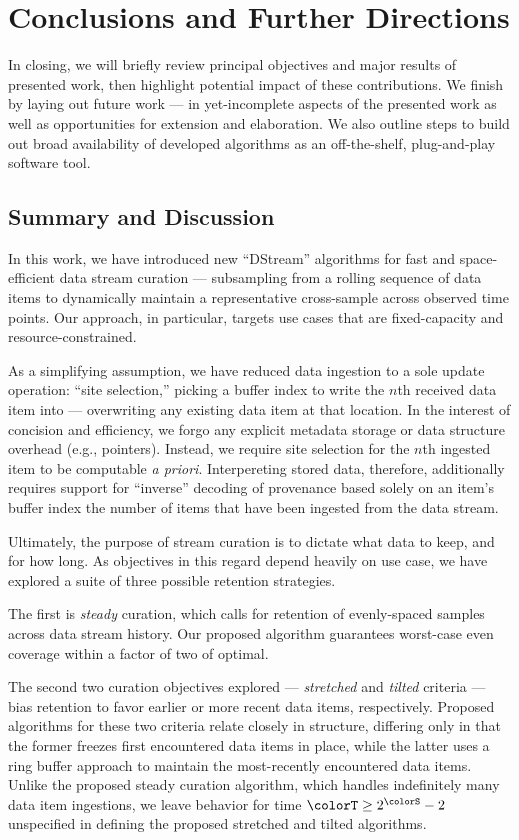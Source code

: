 \section{Conclusions and Further Directions} \label{sec:conclusion}

In closing, we will briefly review principal objectives and major results of presented work, then highlight potential impact of these contributions.
We finish by laying out future work --- in yet-incomplete aspects of the presented work as well as opportunities for extension and elaboration.
We also outline steps to build out broad availability of developed algorithms as an off-the-shelf, plug-and-play software tool.

\subsection{Summary and Discussion}

In this work, we have introduced new ``DStream'' algorithms for fast and space-efficient data stream curation --- subsampling from a rolling sequence of data items to dynamically maintain a representative cross-sample across observed time points.
Our approach, in particular, targets use cases that are fixed-capacity and resource-constrained.

As a simplifying assumption, we have reduced data ingestion to a sole update operation: ``site selection,'' picking a buffer index to write the $n$th received data item into --- overwriting any existing data item at that location.
In the interest of concision and efficiency, we forgo any explicit metadata storage or data structure overhead (e.g., pointers).
Instead, we require site selection for the $n$th ingested item to be computable \textit{a priori}.
Interpereting stored data, therefore, additionally requires support for ``inverse'' decoding of provenance based solely on an item's buffer index the number of items that have been ingested from the data stream.

Ultimately, the purpose of stream curation is to dictate what data to keep, and for how long.
As objectives in this regard depend heavily on use case, we have explored a suite of three possible retention strategies.

The first is \textit{steady} curation, which calls for retention of evenly-spaced samples across data stream history.
Our proposed algorithm guarantees worst-case even coverage within a factor of two of optimal.

The second two curation objectives explored --- \textit{stretched} and \textit{tilted} criteria --- bias retention to favor earlier or more recent data items, respectively.
Proposed algorithms for these two criteria relate closely in structure, differing only in that the former freezes first encountered data items in place, while the latter uses a ring buffer approach to maintain the most-recently encountered data items.
Unlike the proposed steady curation algorithm, which handles indefinitely many data item ingestions, we leave behavior for time $\colorT \geq 2^{\colorS} - 2$ unspecified in defining the proposed stretched and tilted algorithms.

